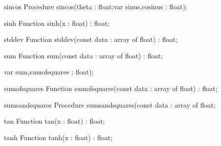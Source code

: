 \FPCexample{}


\begin{procedure}{sincos}
\Declaration
Procedure sincos(theta : float;var sinus,cosinus : float);
\Description

\Errors
\SeeAlso
\end{procedure}

\FPCexample{}


\begin{function}{sinh}
\Declaration
Function sinh(x : float) : float;
\Description

\Errors
\SeeAlso
\end{function}

\FPCexample{}


\begin{function}{stddev}
\Declaration
Function stddev(const data : array of float) : float;
\Description

\Errors
\SeeAlso
\end{function}

\FPCexample{}


\begin{function}{sum}
\Declaration
Function sum(const data : array of float) : float;
\Description

\Errors
\SeeAlso
\end{function}

\FPCexample{}


  var sum,sumofsquares : float);
\begin{function}{sumofsquares}
\Declaration
Function sumofsquares(const data : array of float) : float;
\Description

\Errors
\SeeAlso
\end{function}

\FPCexample{}


\begin{procedure}{sumsandsquares}
\Declaration
Procedure sumsandsquares(const data : array of float;
\Description

\Errors
\SeeAlso
\end{procedure}

\FPCexample{}


\begin{function}{tan}
\Declaration
Function tan(x : float) : float;
\Description

\Errors
\SeeAlso
\end{function}

\FPCexample{}


\begin{function}{tanh}
\Declaration
Function tanh(x : float) : float;
\Description

\Errors
\SeeAlso
\end{function}

